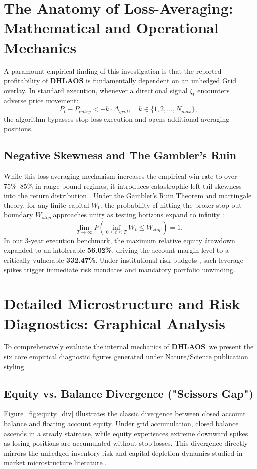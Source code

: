 \documentclass[11pt,a4paper]{article}
\begin{document}
\section{The Anatomy of Loss-Averaging: Mathematical and Operational Mechanics}
A paramount empirical finding of this investigation is that the reported profitability of \textbf{DHLAOS} is fundamentally dependent on an unhedged Grid overlay. In standard execution, whenever a directional signal $\xi_t$ encounters adverse price movement:
\begin{equation}
P_t - P_{entry} < -k \cdot \Delta_{grid}, \quad k \in \{1, 2, \dots, N_{max}\},
\end{equation}
the algorithm bypasses stop-loss execution and opens additional averaging positions. 

\subsection{Negative Skewness and The Gambler's Ruin}
While this loss-averaging mechanism increases the empirical win rate to over 75\%--85\% in range-bound regimes, it introduces catastrophic left-tail skewness into the return distribution \cite{bouchaud2003theory, cont2001empirical}. Under the Gambler's Ruin Theorem and martingale theory, for any finite capital $W_0$, the probability of hitting the broker stop-out boundary $W_{stop}$ approaches unity as testing horizons expand to infinity \cite{bouchaud2009markets}:
\begin{equation}
\lim_{T \to \infty} P\left(\inf_{0 \le t \le T} W_t \le W_{stop}\right) = 1.
\end{equation}
In our 3-year execution benchmark, the maximum relative equity drawdown expanded to an intolerable \textbf{56.02\%}, driving the account margin level to a critically vulnerable \textbf{332.47\%}. Under institutional risk budgets \cite{rockafellar2000optimization, shleifer1997limits}, such leverage spikes trigger immediate risk mandates and mandatory portfolio unwinding.


\section{Detailed Microstructure and Risk Diagnostics: Graphical Analysis}
To comprehensively evaluate the internal mechanics of \textbf{DHLAOS}, we present the six core empirical diagnostic figures generated under Nature/Science publication styling.

\subsection{Equity vs. Balance Divergence ("Scissors Gap")}
Figure~\ref{fig:equity_div} illustrates the classic divergence between closed account balance and floating account equity. Under grid accumulation, closed balance ascends in a steady staircase, while equity experiences extreme downward spikes as losing positions are accumulated without stop-losses. This divergence directly mirrors the unhedged inventory risk and capital depletion dynamics studied in market microstructure literature \cite{shleifer1997limits, bouchaud2009markets}.
\end{document}
